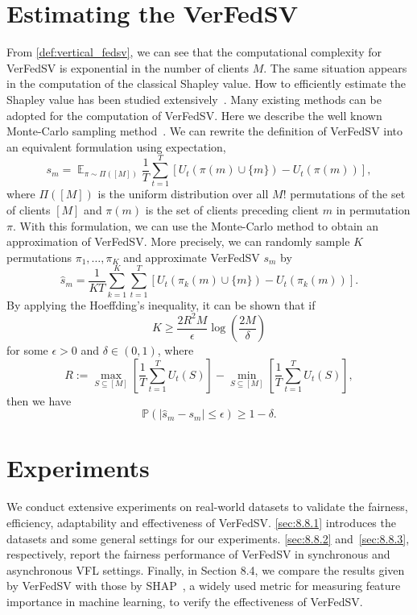 \section{Estimating the VerFedSV} \label{sec:8.7}
From \autoref{def:vertical_fedsv}, we can see that the computational complexity for VerFedSV is exponential in the number of clients $M$. The same situation appears in the computation of the classical Shapley value. How to efficiently estimate the Shapley value has been studied extensively~\cite{ghorbani2019data,jia2019towards}. Many existing methods can be adopted for the computation of VerFedSV. Here we describe the well known Monte-Carlo sampling method~\cite{metropolis1949monte, ghorbani2019data}. We can rewrite the definition of VerFedSV into an equivalent formulation using expectation,
\begin{equation} \label{eq:complete_ev_expectation}
    s_m = \mathop{\mathbb{E}}_{\pi \sim \Pi([M])} \frac{1}{T}\sum_{t=1}^T [U_t(\pi(m)\cup\{m\}) - U_t(\pi(m))],
\end{equation}
where $\Pi([M])$ is the uniform distribution over all $M!$ permutations of the set of clients $[M]$ and $\pi(m)$ is the set of clients preceding client $m$ in permutation $\pi$. With this formulation, we can use the Monte-Carlo method to obtain an approximation of VerFedSV. More precisely, we can randomly sample $K$ permutations $\pi_1, \dots, \pi_K$ and approximate VerFedSV $s_m$ by 
\begin{equation} \label{eq:complete_ev_approx}
    \hat s_m = \frac{1}{KT}\sum_{k=1}^K \sum_{t=1}^T [U_t(\pi_k(m)\cup\{m\}) - U_t(\pi_k(m))].
\end{equation}
By applying the Hoeffding's inequality, it can be shown \cite{jia2019towards} that if 
\[K \geq \frac{2R^2M}{\epsilon}\log\left(\frac{2M}{\delta}\right)\]
for some $\epsilon > 0$ and $\delta \in (0, 1)$, where 
\[R := \max_{S \subseteq [M]} \left[\frac{1}{T}\sum_{t=1}^T U_t(S)\right] - \min_{S \subseteq [M]} \left[\frac{1}{T}\sum_{t=1}^T U_t(S)\right],\]
then we have 
\[\mathbb{P}(|\hat s_m - s_m| \leq \epsilon) \geq 1 - \delta.\]

\section{Experiments} \label{sec:8}
We conduct extensive experiments on real-world datasets to validate the fairness, efficiency, adaptability and effectiveness of VerFedSV. \autoref{sec:8.8.1} introduces the datasets and some general settings for our experiments. \autoref{sec:8.8.2} and~\autoref{sec:8.8.3}, respectively, report the fairness performance of VerFedSV in synchronous and asynchronous VFL settings. Finally, in Section 8.4, we compare the results given by VerFedSV with those by SHAP~\cite{lundberg2017unified}, a widely used metric for measuring feature importance in machine learning, to verify the effectiveness of VerFedSV. 

